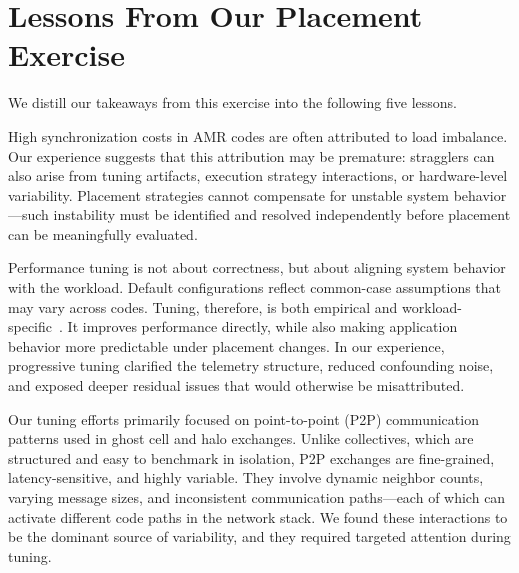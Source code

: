 
\section{Lessons From Our Placement Exercise}\label{sec:amr:lessons}

We distill our takeaways from this exercise into the following five lessons.


\noindent High synchronization costs in AMR codes are often attributed to load imbalance.
Our experience suggests that this attribution may be premature: stragglers can also arise from
tuning artifacts, execution strategy interactions, or hardware-level variability.
Placement strategies cannot compensate for unstable system behavior---such instability must be
identified and resolved independently before placement can be meaningfully evaluated.


\noindent Performance tuning is not about correctness, but about aligning system behavior with the workload.
Default configurations reflect common-case assumptions that may vary across codes.
Tuning, therefore, is both empirical and
workload-specific~\cite{Kruse2023:StatisticalAnalysisHPC,Mijak2016:PERISCOPE,Pelle2012:TuningMPI}.
It improves performance directly, while also making application behavior more predictable under
placement changes.
In our experience, progressive tuning clarified the telemetry structure, reduced confounding noise,
and exposed deeper residual issues that would otherwise be misattributed.


\noindent Our tuning efforts primarily focused on point-to-point (P2P) communication patterns used in ghost
cell and halo exchanges.
Unlike collectives, which are structured and easy to benchmark in isolation, P2P exchanges are
fine-grained, latency-sensitive, and highly variable.
They involve dynamic neighbor counts, varying message sizes, and inconsistent communication
paths---each of which can activate different code paths in the network stack.
We found these interactions to be the dominant source of variability, and they required targeted
attention during tuning.

